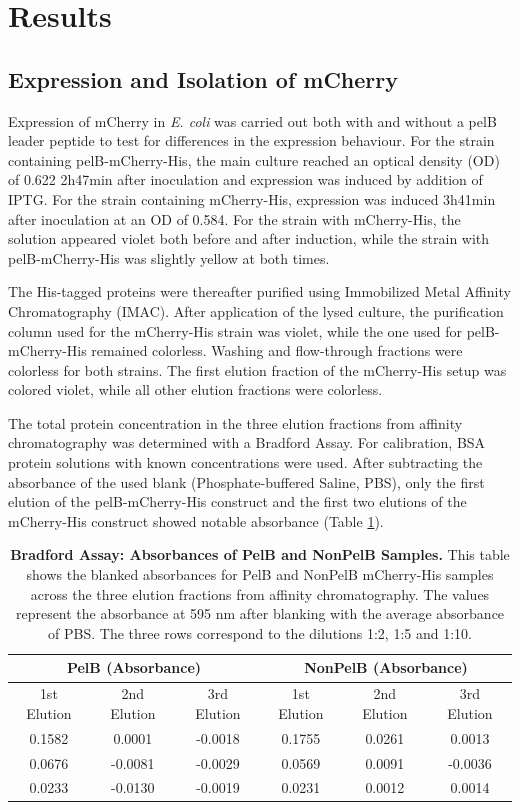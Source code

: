 \documentclass[a4paper,12pt]{article}
\begin{document}
\section{Results}
\subsection{Expression and Isolation of mCherry}
Expression of mCherry in \emph{E. coli} was carried out both with and without a pelB leader peptide to test for differences in the expression behaviour. For the strain containing pelB-mCherry-His, the main culture reached an optical density (OD) of 0.622 2h47min after inoculation and expression was induced by addition of IPTG. For the strain containing mCherry-His, expression was induced 3h41min after inoculation at an OD of 0.584. For the strain with mCherry-His, the solution appeared violet both before and after induction, while the strain with pelB-mCherry-His was slightly yellow at both times.

The His-tagged proteins were thereafter purified using Immobilized Metal Affinity Chromatography (IMAC). After application of the lysed culture, the purification column used for the mCherry-His strain was violet, while the one used for pelB-mCherry-His remained colorless. Washing and flow-through fractions were colorless for both strains. The first elution fraction of the mCherry-His setup was colored violet, while all other elution fractions were colorless. 

The total protein concentration in the three elution fractions from affinity chromatography was determined with a Bradford Assay. For calibration, BSA protein solutions with known concentrations were used. After subtracting the absorbance of the used blank (Phosphate-buffered Saline, PBS), only the first elution of the pelB-mCherry-His construct and the first two elutions of the mCherry-His construct showed notable absorbance (Table \ref{tab:bradford1}). 

\begin{table}[h!]
    \centering
    \caption{\textbf{Bradford Assay: Absorbances of PelB and NonPelB Samples.} This table shows the blanked absorbances for PelB and NonPelB mCherry-His samples across the three elution fractions from affinity chromatography. The values represent the absorbance at 595 nm after blanking with the average absorbance of PBS. The three rows correspond to the dilutions 1:2, 1:5 and 1:10.}
    \begin{tabular}{ccc|ccc}
        \multicolumn{3}{c|}{\textbf{PelB (Absorbance)}} & \multicolumn{3}{c}{\textbf{NonPelB (Absorbance)}} \\
        \hline
        1st Elution & 2nd Elution & 3rd Elution & 1st Elution & 2nd Elution & 3rd Elution \\
        \hline
        0.1582 & 0.0001 & -0.0018 & 0.1755 & 0.0261 & 0.0013 \\
        0.0676 & -0.0081 & -0.0029 & 0.0569 & 0.0091 & -0.0036 \\
        0.0233 & -0.0130 & -0.0019 & 0.0231 & 0.0012 & 0.0014
    \end{tabular}
    \label{tab:bradford1}
\end{table}
\end{document}
